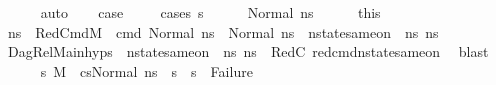 \begin{isabellebody}
\ \ \ \ \isamarkupfalse%
\ auto\isanewline
\ \ \isamarkupfalse%
\ {\isacharquery}{\kern0pt}case\ \isanewline
\ \ \isamarkupfalse%
\ {\isacharparenleft}{\kern0pt}cases\ s{\isacharprime}{\kern0pt}{\isacharprime}{\kern0pt}{\isacharparenright}{\kern0pt}\isanewline
\ \ \ \ \isamarkupfalse%
\ {\isacharparenleft}{\kern0pt}Normal\ ns{}{\isacharprime}{\kern0pt}{\isacharprime}{\kern0pt}{\isacharparenright}{\kern0pt}\isanewline
\ \ \ \ \isamarkupfalse%
\ this\ \isamarkupfalse%
\ ns{}{\isacharprime}{\kern0pt}{\isacharprime}{\kern0pt}\ \ RedCmd{}{\isacharcolon}{\kern0pt}{\isachardoublequoteopen}M{\isacharcomma}{\kern0pt}{\isasymLambda}{\isacharcomma}{\kern0pt}{\isasymGamma}{\isacharcomma}{\kern0pt}{\isasymOmega}\ {\isasymturnstile}\ {\isasymlangle}cmd{\isacharcomma}{\kern0pt}\ Normal\ ns{}{\isasymrangle}\ {\isasymrightarrow}\ Normal\ ns{}{\isacharprime}{\kern0pt}{\isacharprime}{\kern0pt}{\isachardoublequoteclose}\ \ {\isachardoublequoteopen}nstate{\isacharunderscore}{\kern0pt}same{\isacharunderscore}{\kern0pt}on\ {\isasymLambda}\ ns{}{\isacharprime}{\kern0pt}{\isacharprime}{\kern0pt}\ ns{}{\isacharprime}{\kern0pt}{\isacharprime}{\kern0pt}\ {\isacharbraceleft}{\kern0pt}{\isacharbraceright}{\kern0pt}{\isachardoublequoteclose}\isanewline
\ \ \ \ \ \ \isamarkupfalse%
\ DagRel{\isacharunderscore}{\kern0pt}Main{\isachardot}{\kern0pt}hyps{\isacharparenleft}{\kern0pt}{}{\isacharparenright}{\kern0pt}\ {\isacartoucheopen}\ nstate{\isacharunderscore}{\kern0pt}same{\isacharunderscore}{\kern0pt}on\ {\isasymLambda}\ ns{}\ ns{}\ {\isacharbraceleft}{\kern0pt}{\isacharbraceright}{\kern0pt}{\isacartoucheclose}\ RedC{}\ red{\isacharunderscore}{\kern0pt}cmd{\isacharunderscore}{\kern0pt}nstate{\isacharunderscore}{\kern0pt}same{\isacharunderscore}{\kern0pt}on\ \isamarkupfalse%
\ blast\isanewline
\ \ \ \ \isamarkupfalse%
\ {\isachardoublequoteopen}{\isacharparenleft}{\kern0pt}{\isasymAnd}s{}{\isacharprime}{\kern0pt}{\isachardot}{\kern0pt}\ M{\isacharcomma}{\kern0pt}{\isasymLambda}{\isacharcomma}{\kern0pt}{\isasymGamma}{\isacharcomma}{\kern0pt}{\isasymOmega}\ {\isasymturnstile}\ {\isasymlangle}cs{}{\isacharcomma}{\kern0pt}Normal\ ns{}{\isacharprime}{\kern0pt}{\isacharprime}{\kern0pt}{\isasymrangle}\ {\isacharbrackleft}{\kern0pt}{\isasymrightarrow}{\isacharbrackright}{\kern0pt}\ s{}{\isacharprime}{\kern0pt}\ {\isasymLongrightarrow}\ s{}{\isacharprime}{\kern0pt}\ {\isasymnoteq}\ Failure{\isacharparenright}{\kern0pt}{\isachardoublequoteclose}\isanewline

\end{isabellebody}
